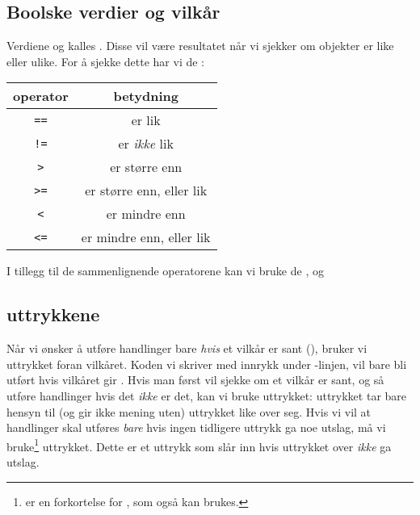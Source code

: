 \subsection{Boolske verdier og vilkår}
Verdiene  og  kalles . Disse vil være resultatet når vi sjekker om objekter er like eller ulike. For å sjekke dette har vi de :
\begin{center}
	\begin{tabular}{c|c}
		\textbf{operator} & \textbf{betydning} \\ \hline
		\texttt{==}	& er lik \\ \rowcolor{gray!10}
		\texttt{!=} & er \textsl{ikke} lik\\
		\texttt{>} & er større enn \\ \rowcolor{gray!10}
		\texttt{>=} & er større enn, eller lik \\
		\texttt{<} & er mindre enn \\ \rowcolor{gray!10}
		\texttt{<=} & er mindre enn, eller lik \\		
	\end{tabular}
\end{center}
\vsk

I tillegg til de sammenlignende operatorene kan vi bruke de  ,  og 
\subsection{ uttrykkene}
Når vi ønsker å utføre handlinger bare \textsl{hvis} et vilkår er sant (), bruker vi  uttrykket foran vilkåret. Koden vi skriver med innrykk under -linjen, vil bare bli utført hvis vilkåret gir . 
Hvis man først vil sjekke om et vilkår er sant, og så utføre handlinger hvis det \textsl{ikke} er det, kan vi bruke  uttrykket:
 uttrykket tar bare hensyn til (og gir ikke mening uten)  uttrykket like over seg. Hvis vi vil at handlinger skal utføres \textsl{bare} hvis ingen tidligere  uttrykk ga noe utslag, må vi bruke\footnote{ er en forkortelse for , som også kan brukes.}  uttrykket. Dette er et  uttrykk som slår inn hvis  uttrykket over \textsl{ikke} ga utslag.

